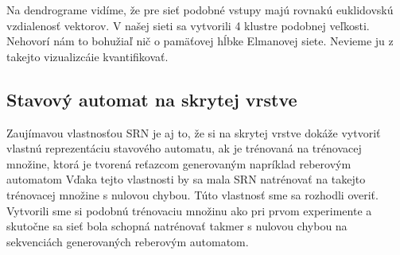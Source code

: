 Na dendrograme vidíme, že pre sieť podobné vstupy majú rovnakú euklidovskú vzdialenosť vektorov.
V našej sieti sa vytvorili 4 klustre podobnej veľkosti. Nehovorí nám to bohužiaľ nič o pamäťovej hĺbke Elmanovej siete.
Nevieme ju z takejto vizualizcáie kvantifikovať.

\subsection{Stavový automat na skrytej vrstve}
Zaujímavou vlastnosťou SRN je aj to, že si na skrytej vrstve dokáže vytvoriť vlastnú reprezentáciu stavového automatu, ak 
je trénovaná na trénovacej množine, ktorá je tvorená reťazcom generovaným napríklad reberovým automatom \cite{Servan-Schreiber1991}
Vďaka tejto vlastnosti by sa mala SRN natrénovať na takejto trénovacej množine s nulovou chybou.
Túto vlastnosť sme sa rozhodli overiť.
Vytvorili sme si podobnú trénovaciu množinu ako pri prvom experimente a skutočne sa sieť bola
schopná natrénovať takmer s nulovou chybou na sekvenciách generovaných reberovým automatom.






